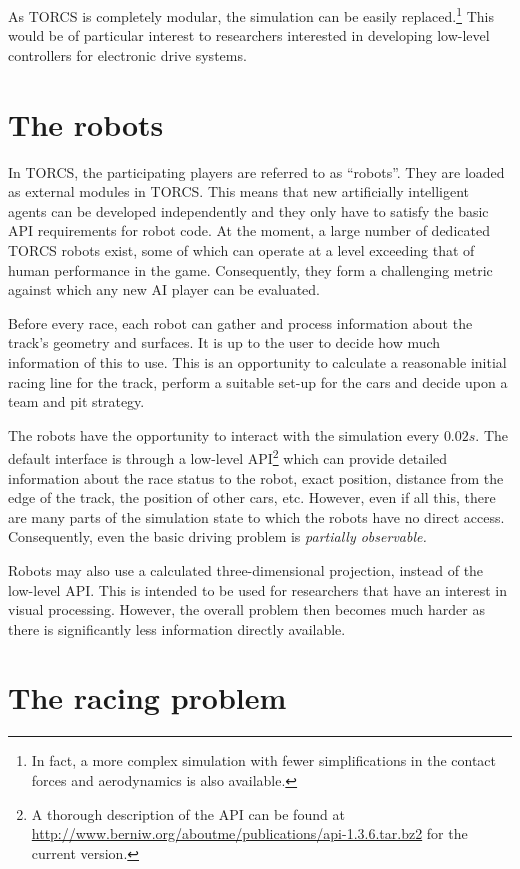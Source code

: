 \documentclass[a4paper]{article}
\begin{document}
As TORCS is completely modular, the simulation can be easily replaced.\footnote{In fact, a more complex simulation with fewer simplifications in the contact forces and aerodynamics is also available.}
This would be of particular interest to researchers interested in developing low-level controllers for electronic drive systems. 

\section{The robots}

In TORCS, the participating players are referred to as ``robots''. They are loaded as external modules in TORCS. This means that new artificially intelligent agents can be developed independently and they only have to satisfy the basic API requirements for robot code. At the moment, a large number of dedicated TORCS robots exist, some of which can operate at a level exceeding that of human performance in the game. Consequently, they form a challenging metric against which any new AI player can be evaluated.

Before every race, each robot can gather and process information about the track's geometry and surfaces. It is up to the user to decide how much information of this to use. This is an opportunity to calculate a reasonable initial racing line for the track, perform a suitable set-up for the cars and decide upon a team and pit strategy.

The robots have the opportunity to interact with the simulation every $0.02s$. The default interface is through a low-level API\footnote{
{A thorough description of the API can be found at \url{http://www.berniw.org/aboutme/publications/api-1.3.6.tar.bz2}} for the current version.} which can provide detailed information about the race status to the robot, exact position, distance from the edge of the track, the position of other cars, etc. However, even if all this, there are many parts of the simulation state to which the robots have no direct access. Consequently, even the basic driving problem is \emph{partially observable.}

Robots may also use a calculated three-dimensional projection, instead of the low-level API. This is intended to be used for researchers that have an interest in visual processing. However, the overall problem then becomes much harder as there is significantly less information directly available. 

\section{The racing problem}
\end{document}

